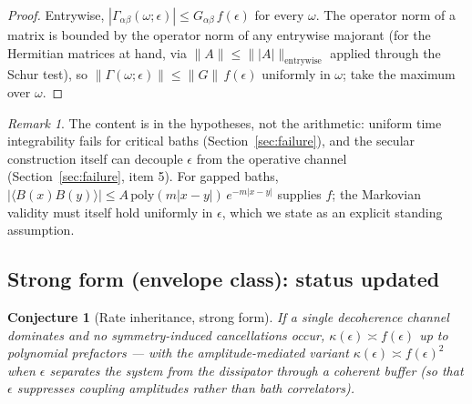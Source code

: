 \documentclass[11pt,a4paper]{article}
\theoremstyle{plain}
\newtheorem{conjecture}[theorem]{Conjecture}
\theoremstyle{definition}
\theoremstyle{remark}
\newtheorem{remark}[theorem]{Remark}
\newcommand{\eps}{\epsilon}
\begin{document}
\begin{proof}
Entrywise, $|\Gamma_{\alpha\beta}(\omega;\eps)| \le G_{\alpha\beta}\,
f(\eps)$ for every $\omega$. The operator norm of a matrix is bounded by the
operator norm of any entrywise majorant (for the Hermitian matrices at hand,
via $\|A\| \le \| |A| \|_{\mathrm{entrywise}}$ applied through the Schur
test), so $\|\Gamma(\omega;\eps)\| \le \|G\|\, f(\eps)$ uniformly in
$\omega$; take the maximum over $\omega$.
\end{proof}

\begin{remark}
The content is in the hypotheses, not the arithmetic: uniform time
integrability fails for critical baths (Section~\ref{sec:failure}), and the
secular construction itself can decouple $\eps$ from the operative channel
(Section~\ref{sec:failure}, item 5). For gapped baths,
$|\langle B(x)B(y)\rangle| \le A\,\mathrm{poly}(m|x-y|)\,e^{-m|x-y|}$
\cite{Clustering} supplies $f$; the Markovian validity must itself hold
uniformly in $\eps$, which we state as an explicit standing assumption.
\end{remark}

\subsection{Strong form (envelope class): status updated}

\begin{conjecture}[Rate inheritance, strong form]\label{conj:strong}
If a single decoherence channel dominates and no symmetry-induced
cancellations occur, $\kappa(\eps) \asymp f(\eps)$ up to polynomial
prefactors --- with the amplitude-mediated variant $\kappa(\eps) \asymp
f(\eps)^2$ when $\eps$ separates the system from the dissipator through a
coherent buffer (so that $\eps$ suppresses coupling \emph{amplitudes} rather
than bath \emph{correlators}).
\end{conjecture}
\end{document}

